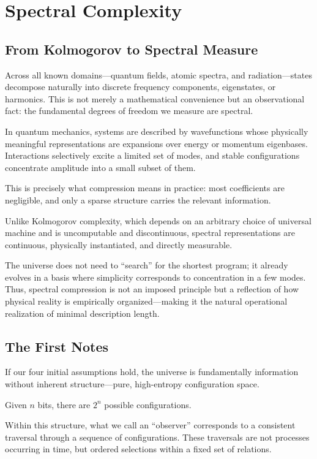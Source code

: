 \chapter{Spectral Complexity}

\section{From Kolmogorov to Spectral Measure}

Across all known domains—quantum fields, atomic spectra, and radiation—states decompose naturally into discrete frequency components, eigenstates, or harmonics.
This is not merely a mathematical convenience but an observational fact: the fundamental degrees of freedom we measure are spectral.

In quantum mechanics, systems are described by wavefunctions whose physically meaningful representations are expansions over energy or momentum eigenbases.
Interactions selectively excite a limited set of modes, and stable configurations concentrate amplitude into a small subset of them.

This is precisely what compression means in practice: most coefficients are negligible, and only a sparse structure carries the relevant information.

Unlike Kolmogorov complexity, which depends on an arbitrary choice of universal machine and is uncomputable and discontinuous, spectral representations are continuous, physically instantiated, and directly measurable.

The universe does not need to “search” for the shortest program; it already evolves in a basis where simplicity corresponds to concentration in a few modes.
Thus, spectral compression is not an imposed principle but a reflection of how physical reality is empirically organized—making it the natural operational realization of minimal description length.


\section{The First Notes}

If our four initial assumptions \cite{meskanen2008} hold, the universe is fundamentally information without inherent structure—pure, high-entropy configuration space.

Given $n$ bits, there are $2^n$ possible configurations.

Within this structure, what we call an “observer” corresponds to a consistent traversal through a sequence of configurations.
These traversals are not processes occurring in time, but ordered selections within a fixed set of relations.


